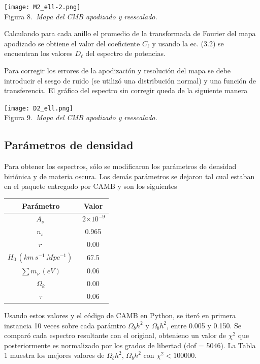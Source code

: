 \documentclass[twocolumn,letterpaper,spanish]{revtex4}
\numberwithin{equation}{section}
\begin{document}
\begin{center}
  \texttt{[image: M2\_ell-2.png]}\\
   Figura 8.\emph{\ Mapa del CMB apodizado y reescalado.}
\end{center}


Calculando para cada anillo el promedio de la transformada de Fourier del mapa apodizado se obtiene el valor del coeficiente $C_{\ell}$ y usando la ec. (3.2) se encuentran los valores $D_{\ell}$ del espectro de potencias.


Para corregir los errores de la apodizaci\'on y resoluci\'on del mapa se debe introducir el sesgo de ruido (se utiliz\'o una distribuci\'on normal) y una funci\'on de transferencia. El gr\'afico del espectro sin corregir queda de la siguiente manera 

\begin{center}
  \texttt{[image: D2\_ell.png]}\\
   Figura 9.\emph{\ Mapa del CMB apodizado y reescalado.}
\end{center}

\subsection{Par\'ametros de densidad}

Para obtener los espectros, s\'olo se modificaron los par\'ametros de densidad biri\'onica y de materia oscura. Los dem\'as par\'ametros se dejaron tal cual estaban en el paquete entregado por CAMB y son los siguientes 

\begin{center}
\begin{tabular}{c | c}
	\,Par\'ametro\, & \,Valor\, \\ \hline
	$A_s$\,  &  \,2$\times10^{-9}$ \\
	$n_s$\,  &  0.965 \\
 	$r$\,    &  0.00  \\
 	$H_0\,(km\,s^{-1}\,Mpc^{-1})$\, &  67.5 \\
 	$\sum m_{\nu}\,(eV)$ & 0.06 \\ 
 	$\Omega_k$ & 0.00 \\
 	$\tau$  & 0.06 \\ 
\end{tabular}\label{tabla1}
\end{center}

Usando estos valores y el c\'odigo de CAMB en Python, se iter\'o en primera instancia 10 veces sobre cada par\'amtro $\Omega_b h^2$ y $\Omega_b h^2$, entre 0.005 y 0.150. Se compar\'o cada espectro resultante con el original, obtenieno un valor de $\chi^2$ que posteriormente es normalizado por los grados de libertad (dof = 5046). La Tabla 1 muestra los mejores valores de $\Omega_b h^2$, $\Omega_b h^2$ con $\chi^2<100000$. 
\end{document}
